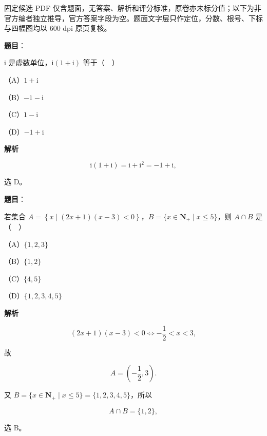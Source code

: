 

\begin{gktip}
固定候选 PDF 仅含题面，无答案、解析和评分标准，原卷亦未标分值；以下为非官方编者独立推导，官方答案字段为空。题面文字层只作定位，分数、根号、下标与四幅图均以 600 dpi 原页复核。
\end{gktip}

\begin{answer}

\textbf{题目}：

$\mathrm i$ 是虚数单位，$\mathrm i(1+\mathrm i)$ 等于（　）

（A）$1+\mathrm i$

（B）$-1-\mathrm i$

（C）$1-\mathrm i$

（D）$-1+\mathrm i$

\textbf{解析}

\nopagebreak[4]
\[\mathrm i(1+\mathrm i)=\mathrm i+\mathrm i^2=-1+\mathrm i,\]

选 D。


\end{answer}
\begin{answer}

\textbf{题目}：

若集合 $A=\left\{x\mid (2x+1)(x-3)<0\right\}$，$B=\{x\in\mathbf N_+\mid x\leqslant5\}$，则 $A\cap B$ 是（　）

（A）$\{1,2,3\}$

（B）$\{1,2\}$

（C）$\{4,5\}$

（D）$\{1,2,3,4,5\}$

\textbf{解析}

\nopagebreak[4]
\[(2x+1)(x-3)<0\iff -\frac12<x<3,\]

故

\nopagebreak[4]
\[A=\left(-\frac12,3\right).\]

又 $B=\{x\in\mathbf N_+\mid x\leqslant5\}=\{1,2,3,4,5\}$，所以

\nopagebreak[4]
\[A\cap B=\{1,2\},\]

选 B。


\end{answer}
